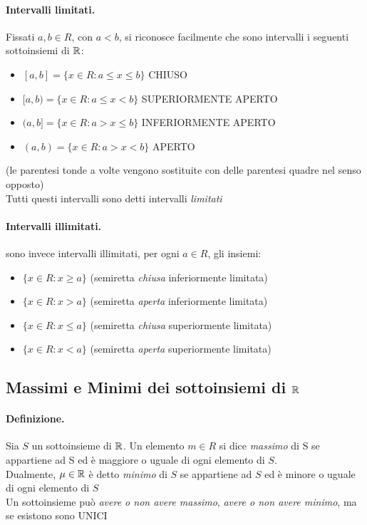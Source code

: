 \documentclass[12pt, a4paper, openany]{book}
\begin{document}
\paragraph{Intervalli limitati.}
Fissati $a, b \in R$, con $a<b$, si riconosce facilmente che sono intervalli i seguenti sottoinsiemi di $\mathbb{R}$:
\begin{itemize}
    \item[] $[a,b] = \{x \in R : a \leq x \leq b\}$ CHIUSO
    \item[] $[a,b) = \{x \in R : a \leq x < b\}$ SUPERIORMENTE APERTO
    \item[] $(a,b] = \{x \in R : a > x \leq b\}$ INFERIORMENTE APERTO
    \item[] $(a,b) = \{x \in R : a > x < b\}$ APERTO
\end{itemize}
{\tiny(le parentesi tonde a volte vengono sostituite con delle parentesi quadre nel senso opposto)}
\\Tutti questi intervalli sono detti intervalli \emph{limitati}
\paragraph{Intervalli illimitati.} sono invece intervalli illimitati, per ogni $a \in R$, gli insiemi:
\begin{itemize}
    \item[] $\{x \in R: x \geq a\}$ (semiretta \emph{chiusa} inferiormente limitata)
    \item[] $\{x \in R: x > a\}$ (semiretta \emph{aperta} inferiormente limitata)
    \item[] $\{x \in R: x \leq a\}$ (semiretta \emph{chiusa} superiormente limitata)
    \item[] $\{x \in R: x < a\}$ (semiretta \emph{aperta} superiormente limitata)
\end{itemize}

\subsection*{Massimi e Minimi dei sottoinsiemi di $\mathbb{R}$}
\paragraph{Definizione.} Sia $S$ un sottoinsieme di $\mathbb{R}$. Un elemento $m\in R$ si dice \emph{massimo} di S se appartiene ad S ed è maggiore o uguale di ogni elemento di $S$.
\\Dualmente, $\mu \in \mathbb{R} $ è detto \emph{minimo} di $S$ se appartiene ad $S$ ed è minore o uguale di ogni elemento di $S$
\\Un sottoinsieme può \emph{avere o non avere massimo}, \emph{avere o non avere minimo}, ma se esistono sono UNICI
\end{document}
